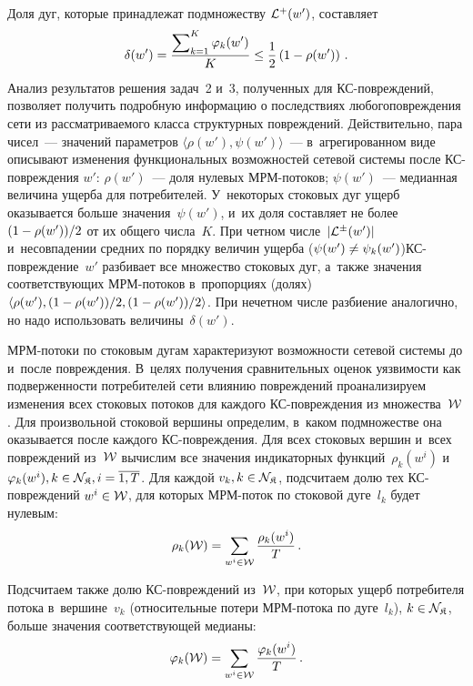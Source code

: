 \begin{multicols}{2}
Доля дуг, которые принадлежат подмножеству ${\cal L}^+(w')$, составляет
$$
\delta(w') = \displaystyle\frac{\displaystyle \sum\nolimits_{k = 1}^K\varphi_k(w')\mathstrut}{\displaystyle K\mathstrut} \leq
\displaystyle\frac{\displaystyle 1\mathstrut}{\displaystyle 2\mathstrut} \left(1 - \rho(w')\right)\,.
$$
Анализ результатов решения задач~2 и~3, полученных для КС-по\-вреж\-де\-ний, 
позволяет получить подробную информацию о последствиях любого\linebreak повреждения сети 
из рассматриваемого класса структурных повреждений. Действительно, пара чисел~--- 
значений параметров $\langle \rho(w'), \psi(w') \rangle$~---
в~агрегированном виде описывают изменения функциональных возможностей 
сетевой системы после КС-по\-вреж\-де\-ния $w'$:
$\rho(w')$~--- доля нулевых МРМ-по\-то\-ков; $\psi(w')$~--- 
медианная величина ущерба для потребителей.
У~некоторых стоковых дуг ущерб оказывается больше значения~$\psi(w')$, 
и~их доля составляет не более
$(1 \hm- \rho(w'))/2$ от их общего числа~$K$. 
При четном числе~$| {\cal L}^{\pm}(w') |$ и~несовпадении средних по 
порядку величин ущерба ($\psi(w')\hm\ne \psi_k(w')$)\linebreak КС-по\-вреж\-де\-ние~$w'$ 
разбивает все множество стоковых дуг, а~также значения соответствующих 
МРМ-по\-то\-ков в~пропорциях (долях)
$\langle \rho(w'), (1 \hm- \rho(w'))/2, (1 \hm- \rho(w'))/2 \rangle$. 
При нечетном числе разбиение аналогично, но надо использовать величины~$\delta(w')$.



МРМ-потоки по стоковым дугам характеризуют возможности сетевой 
системы до и~после по\-вреж\-де\-ния. В~целях получения сравнительных оце\-нок 
уязвимости как подверженности потребителей сети влиянию повреждений 
проанализируем изменения всех стоковых потоков для каждого КС-по\-вреж\-де\-ния 
из множества~${\cal W}$. Для произвольной стоковой вершины определим, 
в~каком подмножестве она оказывается после каждого КС-по\-вреж\-де\-ния. 
Для всех стоковых вершин и~всех повреждений 
из~${\cal W}$ вычислим все значения индикаторных функций~$\rho_k(w^i)$ 
и~$\varphi_k(w^i), k \in {\cal N}_{{\frak K}}, i = \overline{1, T}$. 
Для каждой $v_k, k \in {\cal N}_{{\frak K}}$, подсчитаем долю  тех КС-по\-вреж\-де\-ний 
$w^i \hm\in {\cal W}$, для которых МРМ-по\-ток по стоковой дуге~$l_k$ будет нулевым:
$$
\rho_k({\cal W}) = \sum\limits_{w^i \in {\cal W}}\displaystyle\frac{\displaystyle \rho_k(w^i)\mathstrut}{\displaystyle T\mathstrut}\,.  
$$

Подсчитаем также долю КС-по\-вреж\-де\-ний из~${\cal W}$, при которых ущерб 
потребителя потока в~вершине~$v_k$ (относительные потери МРМ-по\-то\-ка по дуге~$l_k$), 
$k \hm\in {\cal N}_{\SK}$, больше значения соответствующей медианы:
$$
 \varphi_k({\cal W}) = \sum\limits_{w^i \in {\cal W}}\displaystyle\frac{\displaystyle \varphi_k(w^i)\mathstrut}{\displaystyle T\mathstrut}\,. 
 $$


\end{multicols}
